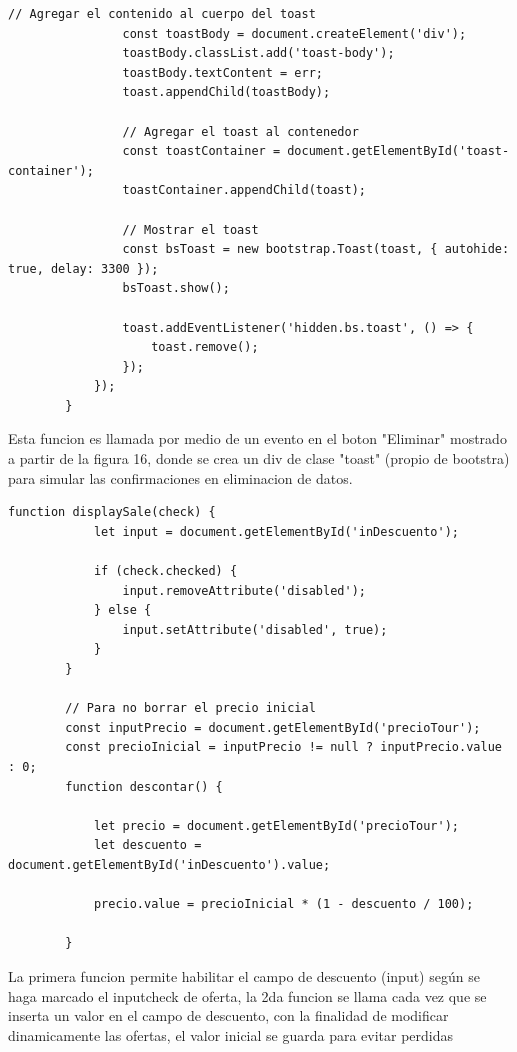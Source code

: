 \documentclass{article}
\begin{document}
\begin{lstlisting}[caption={script delete}, label={codigo-scripts}]
                // Agregar el contenido al cuerpo del toast
                const toastBody = document.createElement('div');
                toastBody.classList.add('toast-body');
                toastBody.textContent = err;
                toast.appendChild(toastBody);
        
                // Agregar el toast al contenedor
                const toastContainer = document.getElementById('toast-container');
                toastContainer.appendChild(toast);
        
                // Mostrar el toast
                const bsToast = new bootstrap.Toast(toast, { autohide: true, delay: 3300 });
                bsToast.show();
        
                toast.addEventListener('hidden.bs.toast', () => {
                    toast.remove();
                });
            });
        }
        \end{lstlisting}

        Esta funcion es llamada por medio de un evento en el boton "Eliminar" mostrado a partir de la figura 16, donde se crea un div de clase "toast" (propio de bootstra) para simular las confirmaciones en eliminacion de datos.

        \begin{lstlisting}[caption={script descuento}, label={codigo-scripts}]
        function displaySale(check) {
            let input = document.getElementById('inDescuento');
        
            if (check.checked) {
                input.removeAttribute('disabled');
            } else {
                input.setAttribute('disabled', true);
            }
        }
        
        // Para no borrar el precio inicial
        const inputPrecio = document.getElementById('precioTour'); 
        const precioInicial = inputPrecio != null ? inputPrecio.value : 0;
        function descontar() {
        
            let precio = document.getElementById('precioTour');
            let descuento = document.getElementById('inDescuento').value;
            
            precio.value = precioInicial * (1 - descuento / 100);
        
        }
        \end{lstlisting}

        La primera funcion permite habilitar el campo de descuento (input) según se haga marcado el inputcheck de oferta, la 2da funcion se llama cada vez que se inserta un valor en el campo de descuento, con la finalidad de modificar dinamicamente las ofertas, el valor inicial se guarda para evitar perdidas
    
\end{document}
